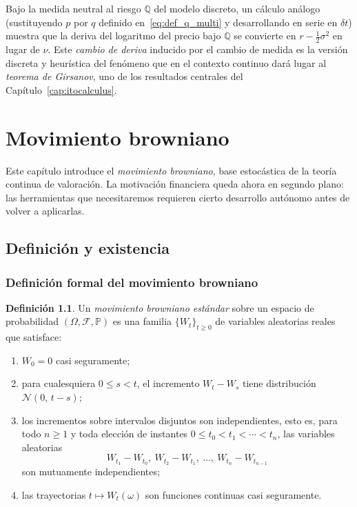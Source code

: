\documentclass[11pt,a4paper,oneside]{report}
\theoremstyle{plain}
\theoremstyle{definition}
\newtheorem{definicion}[teorema]{Definición}
\theoremstyle{remark}
\newcommand{\PP}{\mathbb{P}}
\newcommand{\Q}{\mathbb{Q}}
\newcommand{\F}{\mathcal{F}}
\newcommand{\1}{\mathbf{1}}
\begin{document}
Bajo la medida neutral al riesgo $\Q$ del modelo discreto, un cálculo
análogo (sustituyendo $p$ por $q$ definido
en~\eqref{eq:def_q_multi} y desarrollando en serie en $\delta t$)
muestra que la deriva del logaritmo del precio bajo $\Q$ se convierte
en $r - \tfrac{1}{2}\sigma^2$ en lugar de $\nu$. Este \emph{cambio de
deriva} inducido por el cambio de medida es la versión discreta y
heurística del fenómeno que en el contexto continuo dará lugar al
\emph{teorema de Girsanov}, uno de los resultados centrales del
Capítulo~\ref{cap:itocalculus}.


\chapter{Movimiento browniano}\label{cap:brown}

Este capítulo introduce el \emph{movimiento browniano}, base estocástica de la teoría continua de valoración. La motivación
financiera queda ahora en segundo plano: las herramientas que
necesitaremos requieren cierto desarrollo autónomo antes de volver
a aplicarlas.

\section{Definición y existencia}
\label{sec:browniano_definicion}

\subsection{Definición formal del movimiento browniano}
\label{subsec:browniano_def}

\begin{definicion}
\label{def:browniano}
Un \emph{movimiento browniano estándar} sobre un espacio de
probabilidad $(\Omega, \F, \PP)$ es una familia $\{W_t\}_{t \geq 0}$ de
variables aleatorias reales que satisface:
\begin{enumerate}[label=\textnormal{(\roman*)}]
  \item $W_0 = 0$ casi seguramente;
  \item para cualesquiera $0 \leq s < t$, el incremento $W_t - W_s$
        tiene distribución $\mathcal{N}(0,\, t - s)$;
  \item los incrementos sobre intervalos disjuntos son
        independientes, esto es, para todo $n \geq 1$ y toda elección
        de instantes $0 \leq t_0 < t_1 < \cdots < t_n$, las variables
        aleatorias
        \begin{equation*}
          W_{t_1} - W_{t_0},\ W_{t_2} - W_{t_1},\ \ldots,\
          W_{t_n} - W_{t_{n-1}}
        \end{equation*}
        son mutuamente independientes;
  \item las trayectorias $t \mapsto W_t(\omega)$ son funciones
        continuas casi seguramente.
\end{enumerate}
\end{definicion}
\end{document}
